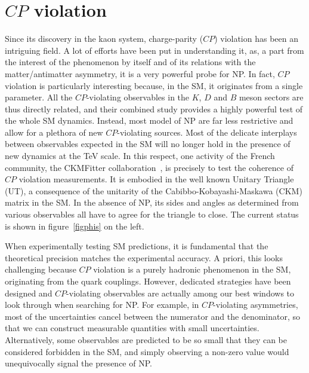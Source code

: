 

\section{$CP$ violation}
\label{sec:cpv}
Since its discovery in the kaon system, charge-parity ($CP$) violation has been an intriguing field. A lot of efforts have been put in understanding it, as,  a part from the interest of the phenomenon by itself and of its relations with the matter/antimatter asymmetry, it is a very powerful probe for NP.  In fact,  $CP$ violation is particularly interesting because, in the SM, it originates from a single parameter. All the $CP$-violating observables in the $K$, $D$ and $B$ meson sectors are thus directly related, and
their combined study provides a highly powerful test of the whole SM dynamics.
Instead, most model of NP are far less restrictive and allow for a
plethora of new $CP$-violating sources. 
Most of the delicate interplays between observables
expected in the SM will no longer hold in the presence of new dynamics at the TeV scale.   
In this respect, one
activity of the French community, the CKMFitter collaboration~\cite{Charles:2004jd}, is precisely
to test the coherence of $CP$ violation measurements. It is embodied in the well
known Unitary Triangle (UT), a consequence of the unitarity of the Cabibbo-Kobayashi-Maskawa (CKM) matrix
in the SM. In the absence of NP, its sides and angles as determined
from various observables all have to agree for the triangle to close. The current status is shown in figure~\ref{figphis} on the left.  


When experimentally testing SM predictions, it is fundamental that the
theoretical precision matches the experimental accuracy. A priori, this looks
challenging because $CP$ violation is a purely hadronic phenomenon in the SM,
originating from the quark couplings. However, dedicated strategies have been
designed and $CP$-violating observables are actually among our best windows to look through when searching for  NP. For
example, in $CP$-violating asymmetries, most of the uncertainties cancel between
the numerator and the denominator, so that we can construct measurable
quantities with small uncertainties. Alternatively, some observables are
predicted to be so small that they can be considered forbidden in the SM, and
simply observing a non-zero value would unequivocally signal the presence of
NP.

